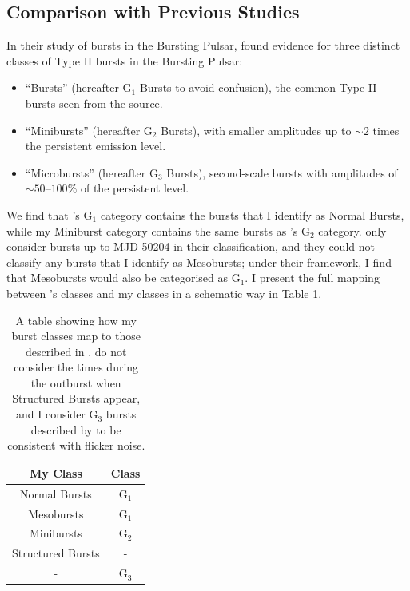 \subsection{Comparison with Previous Studies}

\par In their study of bursts in the Bursting Pulsar, \citet{Giles_BP} found evidence for three distinct classes of Type II bursts in the Bursting Pulsar:

\begin{itemize}
\item ``Bursts'' (hereafter G$_1$ Bursts to avoid confusion), the common Type II bursts seen from the source.
\item ``Minibursts'' (hereafter G$_2$  Bursts), with smaller amplitudes up to $\sim2$ times the persistent emission level.
\item ``Microbursts'' (hereafter G$_3$  Bursts), second-scale bursts with amplitudes of $\sim50$--$100\%$ of the persistent level.
\end{itemize}

We find that \citeauthor{Giles_BP}'s G$_1$ category contains the bursts that I identify as Normal Bursts, while my Miniburst category contains the same bursts as \citeauthor{Giles_BP}'s G$_2$ category.  \citeauthor{Giles_BP} only consider bursts up to MJD 50204 in their classification, and they could not classify any bursts that I identify as Mesobursts; under their framework, I find that Mesobursts would also be categorised as G$_1$.  I present the full mapping between \citeauthor{Giles_BP}'s classes and my classes in a schematic way in Table \ref{tab:classcomp}.

\begin{table}
\centering
\begin{tabular}{c c}
\hline
\hline
 \scriptsize My Class & \scriptsize \citeauthor{Giles_BP} Class  \\
\hline
Normal Bursts & G$_1$ \\
Mesobursts & G$_1$ \\
Minibursts & G$_2$ \\
Structured Bursts & - \\
 - & G$_3$ \\
\hline
\hline
\end{tabular}
\caption[A table showing how my burst classes for the Bursting Pulsar map to those described in \citet{Giles_BP}.]{A table showing how my burst classes map to those described in \citet{Giles_BP}.  \citeauthor{Giles_BP} do not consider the times during the outburst when Structured Bursts appear, and I consider G$_3$ bursts described by \citeauthor{Giles_BP} to be consistent with flicker noise.}
\label{tab:classcomp}
\end{table}

